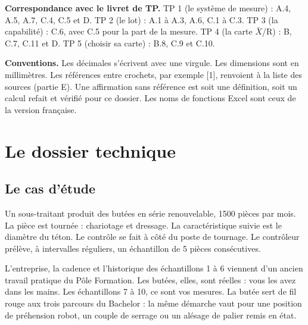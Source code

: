 \documentclass[11pt,a4paper]{article}
\begin{document}
\textbf{Correspondance avec le livret de TP.} TP 1 (le système de mesure) : A.4, A.5, A.7, C.4, C.5 et D. TP 2 (le lot) : A.1 à A.3, A.6, C.1 à C.3. TP 3 (la capabilité) : C.6, avec C.5 pour la part de la mesure. TP 4 (la carte $\bar X$/R) : B, C.7, C.11 et D. TP 5 (choisir sa carte) : B.8, C.9 et C.10.

\textbf{Conventions.} Les décimales s'écrivent avec une virgule. Les dimensions sont en millimètres. Les références entre crochets, par exemple [1], renvoient à la liste des sources (partie E). Une affirmation sans référence est soit une définition, soit un calcul refait et vérifié pour ce dossier. Les noms de fonctions Excel sont ceux de la version française.

{\small\tableofcontents}

\clearpage
\section{Le dossier technique}
\subsection{Le cas d'étude}
Un sous-traitant produit des butées en série renouvelable, \num{1500} pièces par mois. La pièce est tournée : chariotage et dressage. La caractéristique suivie est le diamètre du téton. Le contrôle se fait à côté du poste de tournage. Le contrôleur prélève, à intervalles réguliers, un échantillon de 5 pièces consécutives.

\begin{retenir}
L'entreprise, la cadence et l'historique des échantillons 1 à 6 viennent d'un ancien travail pratique du Pôle Formation. Les butées, elles, sont réelles : vous les avez dans les mains. Les échantillons 7 à 10, ce sont vos mesures. La butée sert de fil rouge aux trois parcours du Bachelor : la même démarche vaut pour une position de préhension robot, un couple de serrage ou un alésage de palier remis en état.
\end{retenir}
\end{document}
